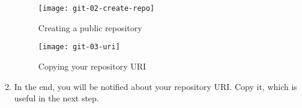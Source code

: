 \begin{enumerate}
\begin{figure}[t]
\centering
\texttt{[image: git-02-create-repo]}
\caption{Creating a public repository\label{git-02-create-repo}}
\end{figure}

\begin{figure}[t]
\centering
\texttt{[image: git-03-uri]}
\caption{Copying your repository URI\label{git-03-uri}}
\end{figure}

\item In the end, you will be notified about your repository URI. Copy it, which
is useful in the next step.

\end{enumerate}

